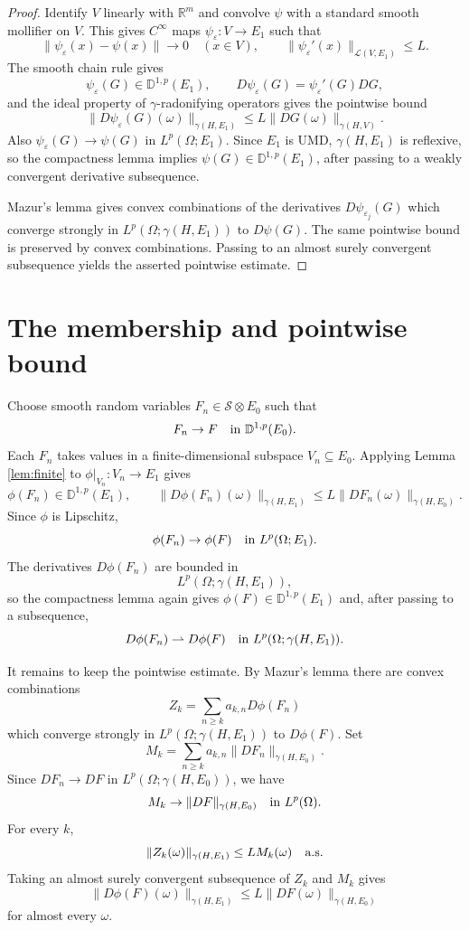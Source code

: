 \documentclass[11pt]{article}
\newcommand{\R}{\mathbb{R}}
\newcommand{\D}{\mathbb{D}}
\newcommand{\g}{\gamma}
\newcommand{\cL}{\mathcal L}
\newcommand{\1}{\mathbf 1}
\begin{document}
\begin{proof}
Identify \(V\) linearly with \(\R^m\) and convolve \(\psi\) with a standard
smooth mollifier on \(V\).  This gives \(C^\infty\) maps
\(\psi_\varepsilon:V\to E_1\) such that
\[
  \|\psi_\varepsilon(x)-\psi(x)\|\to0\quad (x\in V),
  \qquad
  \|\psi_\varepsilon'(x)\|_{\cL(V,E_1)}\leq L .
\]
The smooth chain rule \cite[Proposition 3.9]{PV} gives
\[
  \psi_\varepsilon(G)\in\D^{1,p}(E_1),\qquad
  D\psi_\varepsilon(G)=\psi_\varepsilon'(G)DG,
\]
and the ideal property of \(\gamma\)-radonifying operators gives the pointwise
bound
\[
  \|D\psi_\varepsilon(G)(\omega)\|_{\g(H,E_1)}
  \leq L\|DG(\omega)\|_{\g(H,V)} .
\]
Also \(\psi_\varepsilon(G)\to\psi(G)\) in \(L^p(\Omega;E_1)\).  Since \(E_1\)
is UMD, \(\g(H,E_1)\) is reflexive, so the compactness lemma
\cite[Lemma 3.8]{PV} implies \(\psi(G)\in\D^{1,p}(E_1)\), after passing to a
weakly convergent derivative subsequence.

Mazur's lemma gives convex combinations of the derivatives
\(D\psi_{\varepsilon_j}(G)\) which converge strongly in
\(L^p(\Omega;\g(H,E_1))\) to \(D\psi(G)\).  The same pointwise bound is
preserved by convex combinations.  Passing to an almost surely convergent
subsequence yields the asserted pointwise estimate.
\end{proof}

\section*{The membership and pointwise bound}

Choose smooth random variables \(F_n\in\mathscr S\otimes E_0\) such that
\[
  F_n\to F \quad\hbox{in }\D^{1,p}(E_0).
\]
Each \(F_n\) takes values in a finite-dimensional subspace \(V_n\subseteq E_0\).
Applying Lemma \ref{lem:finite} to \(\phi|_{V_n}:V_n\to E_1\) gives
\[
  \phi(F_n)\in\D^{1,p}(E_1),\qquad
  \|D\phi(F_n)(\omega)\|_{\g(H,E_1)}
  \leq L\|DF_n(\omega)\|_{\g(H,E_0)} .
\]
Since \(\phi\) is Lipschitz,
\[
  \phi(F_n)\to\phi(F) \quad\hbox{in } L^p(\Omega;E_1).
\]
The derivatives \(D\phi(F_n)\) are bounded in
\[
  L^p(\Omega;\g(H,E_1)),
\]
so the compactness lemma again gives
\(\phi(F)\in\D^{1,p}(E_1)\) and, after passing to a subsequence,
\[
  D\phi(F_n)\rightharpoonup D\phi(F)
  \quad\hbox{in }L^p(\Omega;\g(H,E_1)).
\]

It remains to keep the pointwise estimate.  By Mazur's lemma there are convex
combinations
\[
  Z_k=\sum_{n\geq k} a_{k,n}D\phi(F_n)
\]
which converge strongly in \(L^p(\Omega;\g(H,E_1))\) to \(D\phi(F)\).  Set
\[
  M_k=\sum_{n\geq k} a_{k,n}\|DF_n\|_{\g(H,E_0)} .
\]
Since \(DF_n\to DF\) in \(L^p(\Omega;\g(H,E_0))\), we have
\[
  M_k\to \|DF\|_{\g(H,E_0)}
  \quad\hbox{in }L^p(\Omega).
\]
For every \(k\),
\[
  \|Z_k(\omega)\|_{\g(H,E_1)}\leq L M_k(\omega)
  \quad\hbox{a.s.}
\]
Taking an almost surely convergent subsequence of \(Z_k\) and \(M_k\) gives
\[
  \|D\phi(F)(\omega)\|_{\g(H,E_1)}
  \leq L\|DF(\omega)\|_{\g(H,E_0)}
\]
for almost every \(\omega\).
\end{document}
